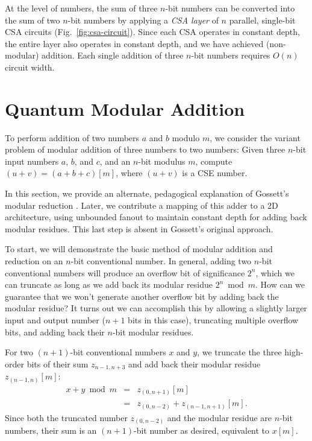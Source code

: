 \documentclass[twoside]{article}
\begin{document}
At the level of numbers, the sum of three $n$-bit numbers can be converted into
the sum of two $n$-bit numbers by applying a \emph{CSA layer} of
$n$ parallel, single-bit
CSA circuits (Fig.~\ref{fig:csa-circuit}). Since each CSA operates in constant depth, the entire layer also
operates in constant depth, and we have achieved (non-modular) addition.
%
Each single addition of three $n$-bit numbers requires $O(n)$ circuit width.

%
\section{Quantum Modular Addition}
\label{sec:csa-mod-add}

To perform addition of two numbers $a$ and $b$ modulo $m$,
we consider the variant problem of modular addition of three numbers to
two numbers:
%
Given three $n$-bit input numbers $a$, $b$, and $c$, and an $n$-bit modulus $m$,
compute
$(u+v) = (a+b+c)[m]$,
where $(u+v)$ is a CSE number.

In this section, we provide an alternate, pedagogical explanation of
Gossett's modular reduction \cite{Gossett1998}. Later, we contribute a mapping of this adder
to a 2D architecture,
using unbounded fanout to maintain constant depth for adding back
modular residues. This last step is absent in Gossett's original approach.

To start, we will demonstrate the basic method of modular addition and reduction
on an $n$-bit conventional number. In general, adding two $n$-bit conventional
numbers will produce an overflow bit of significance $2^n$, which we can truncate as long as
we add back its modular residue $2^n \bmod m$. How can we guarantee that we won't
generate another overflow bit by adding back the modular residue? It turns out
we can accomplish this by allowing
a slightly larger input and output number ($n+1$ bits in this case), truncating
multiple overflow bits, and adding back their $n$-bit modular residues.

For two $(n+1)$-bit conventional numbers $x$ and $y$,
we truncate the three high-order bits of their sum $z_{n-1,n+3}$
and
add back their modular residue $z_{(n-1,n)}[m]$:
%
\begin{eqnarray}
x + y \bmod m &=& z_{(0,n+1)}[m] \nonumber \\
&=& z_{(0,n-2)} + z_{(n-1,n+1)}[m].
\end{eqnarray}
%
Since both the truncated number $z_{(0,n-2)}$ and the modular residue
are $n$-bit numbers, their sum is an $(n+1)$-bit number as desired, equivalent
to $x[m]$.
\end{document}

